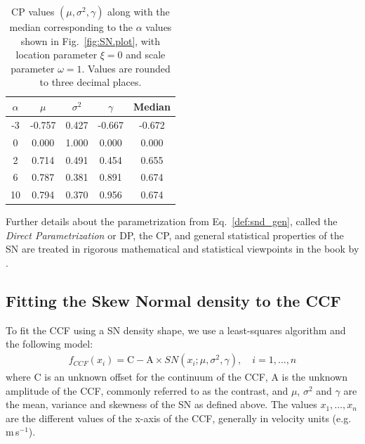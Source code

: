 \documentclass{aa}
\def\ms{\hbox{\,m\,s$^{-1}$}}         %
\begin{document}
\begin{table}[htbp]
\begin{center}
   \begin{tabular}{|ccccc|} %
\hline
$\alpha$ & $\mu$ & $\sigma^2$ & $\gamma$  & Median \\
\hline
 -3 	&	 -0.757	&	 0.427	&	 -0.667  	& 	-0.672\\
0	&	 0.000 	&	1.000	&	 0.000 	& 	0.000\\
2	&	 0.714	&	 0.491	&	 0.454 	& 	0.655\\
6	&	 0.787	&	 0.381	&	 0.891 	& 	0.674\\
10	&	 0.794	&	 0.370	&	 0.956 	& 	0.674\\
\hline
   \end{tabular}
   \caption{CP values $(\mu, \sigma^2, \gamma)$ along with the median corresponding to the $\alpha$ values shown in Fig.~\ref{fig:SN.plot}, with location parameter $\xi = 0$ and scale parameter $\omega = 1$. Values are rounded to three decimal places.}
   \label{tab:cp_values}
\end{center}
\end{table}
%
Further details about the parametrization from Eq.~\ref{def:snd_gen}, called the \emph{Direct Parametrization} or DP, the CP, and general statistical properties of the SN are treated in rigorous mathematical and statistical viewpoints in the book by \cite{Azzalini2014}.

\subsection{Fitting the Skew Normal density to the CCF} \label{sec:3}

To fit the CCF using a SN density shape, we use a least-squares algorithm and the following model:
%
\begin{eqnarray} \label{eq:3}
f_{CCF}(x_i) = \mathrm{C} - \mathrm{A} \times SN(x_i;\mu, \sigma^2, \gamma), \quad i = 1, \ldots, n
\end{eqnarray}
%
where C is an unknown offset for the continuum of the CCF, A is the unknown amplitude of the CCF, commonly referred to as the contrast, and $\mu$, $\sigma^2$ and $\gamma$ are the mean, variance and skewness of the SN as defined above.
The values $x_1, \ldots, x_n$ are the different values of the x-axis of the CCF, generally in velocity units (e.g. \ms).
\end{document}
